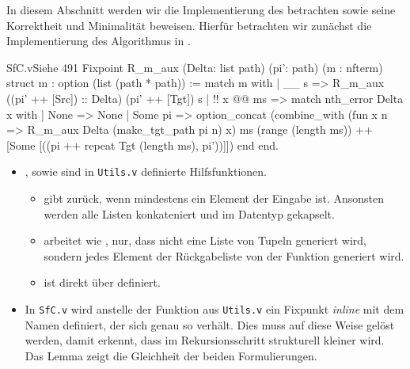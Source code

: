 In diesem Abschnitt werden wir die Implementierung des  betrachten sowie seine Korrektheit und Minimalität beweisen. Hierfür betrachten wir zunächst die Implementierung des Algorithmus in .
\begin{code}[R_m_aux]{SfC.v}{Siehe }{491}
Fixpoint R_m_aux (Delta: list path) (pi': path) (m : nfterm) 
  {struct m} : option (list (path * path)) :=
    match m with
    | \__ s => R_m_aux ((pi' ++ [Src]) :: Delta) (pi' ++ [Tgt]) s
    | !! x @@ ms => 
        match nth_error Delta x with
        | None => None
        | Some pi => 
           option_concat (combine_with 
            (fun x n => R_m_aux Delta (make_tgt_path pi n) x)
            ms (range (length ms)) ++
             [Some [((pi ++ repeat Tgt (length ms), pi'))]])
        end
     end.
\end{code}
\begin{remark}
    \begin{itemize}
        \item {},  sowie  sind in \texttt{Utils.v} definierte Hilfsfunktionen. 
        \begin{itemize}
            \item {} gibt  zurück, wenn mindestens ein Element der Eingabe  ist. Ansonsten werden alle Listen konkateniert und im  Datentyp gekapselt.
            \item {} arbeitet wie , nur, dass nicht eine Liste von Tupeln  generiert wird, sondern jedes Element der Rückgabeliste von der Funktion  generiert wird.
            \item {} ist direkt über  definiert.
        \end{itemize}
        \item In \texttt{SfC.v} wird anstelle der Funktion  aus \texttt{Utils.v} ein Fixpunkt \emph{inline} mit dem Namen  definiert, der sich genau so verhält. Dies muss auf diese Weise gelöst werden, damit \coq{} erkennt, dass im Rekursionsschritt  strukturell kleiner wird. Das Lemma  zeigt die Gleichheit der beiden Formulierungen.
    \end{itemize}
\end{remark}

